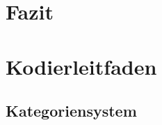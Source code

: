 \documentclass[12pt, titlepage=true, toc=bib]{scrartcl}
\begin{document}
\section{Fazit}




\newpage

\nocite{medici_faschistische_1941}
\nocite{a._v._s._kameradschaft_1936}
\nocite{maltzahn_deutsche_1936}
\nocite{reimer_glucklich_1941}
\nocite{scholtz-klink_frauen_1936}
\nocite{weinhandl_wie_1941}
\nocite{friewart_japanisches_1941}


\printbibheading[title=Literaturverzeichnis]
\printbibliography[heading=subbibliography, keyword={Quelle}, title={Quellen}]
\printbibliography[heading=subbibliography, notkeyword={Quelle}]
\newpage

\appendix

\addpart{\appendixname}

\section{Kodierleitfaden}

\subsection*{Kategoriensystem}
\end{document}
